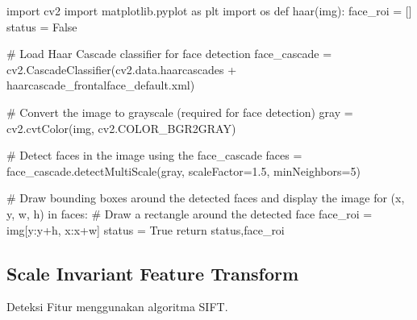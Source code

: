 \documentclass[
  letterpaper,
  DIV=11,
  numbers=noendperiod]{scrreprt}
\newenvironment{Shaded}{\begin{snugshade}}{\end{snugshade}}
\newcommand{\CommentTok}[1]{\textcolor[rgb]{0.37,0.37,0.37}{#1}}
\newcommand{\ControlFlowTok}[1]{\textcolor[rgb]{0.00,0.23,0.31}{#1}}
\newcommand{\DecValTok}[1]{\textcolor[rgb]{0.68,0.00,0.00}{#1}}
\newcommand{\FloatTok}[1]{\textcolor[rgb]{0.68,0.00,0.00}{#1}}
\newcommand{\ImportTok}[1]{\textcolor[rgb]{0.00,0.46,0.62}{#1}}
\newcommand{\KeywordTok}[1]{\textcolor[rgb]{0.00,0.23,0.31}{#1}}
\newcommand{\NormalTok}[1]{\textcolor[rgb]{0.00,0.23,0.31}{#1}}
\newcommand{\OperatorTok}[1]{\textcolor[rgb]{0.37,0.37,0.37}{#1}}
\newcommand{\StringTok}[1]{\textcolor[rgb]{0.13,0.47,0.30}{#1}}
\newcommand{\VariableTok}[1]{\textcolor[rgb]{0.07,0.07,0.07}{#1}}
\begin{document}
\begin{Shaded}
\begin{Highlighting}[]
\ImportTok{import}\NormalTok{ cv2}
\ImportTok{import}\NormalTok{ matplotlib.pyplot }\ImportTok{as}\NormalTok{ plt}
\ImportTok{import}\NormalTok{ os}
\KeywordTok{def}\NormalTok{ haar(img):}
\NormalTok{    face\_roi }\OperatorTok{=}\NormalTok{ []}
\NormalTok{    status }\OperatorTok{=} \VariableTok{False}  

    \CommentTok{\# Load Haar Cascade classifier for face detection}
\NormalTok{    face\_cascade }\OperatorTok{=}\NormalTok{ cv2.CascadeClassifier(cv2.data.haarcascades }\OperatorTok{+} \StringTok{\textquotesingle{}haarcascade\_frontalface\_default.xml\textquotesingle{}}\NormalTok{)  }

    \CommentTok{\# Convert the image to grayscale (required for face detection)}
\NormalTok{    gray }\OperatorTok{=}\NormalTok{ cv2.cvtColor(img, cv2.COLOR\_BGR2GRAY)}

    \CommentTok{\# Detect faces in the image using the face\_cascade}
\NormalTok{    faces }\OperatorTok{=}\NormalTok{ face\_cascade.detectMultiScale(gray, scaleFactor}\OperatorTok{=}\FloatTok{1.5}\NormalTok{, minNeighbors}\OperatorTok{=}\DecValTok{5}\NormalTok{)  }

    \CommentTok{\# Draw bounding boxes around the detected faces and display the image}
    \ControlFlowTok{for}\NormalTok{ (x, y, w, h) }\KeywordTok{in}\NormalTok{ faces:}
        \CommentTok{\# Draw a rectangle around the detected face}
\NormalTok{        face\_roi }\OperatorTok{=}\NormalTok{ img[y:y}\OperatorTok{+}\NormalTok{h, x:x}\OperatorTok{+}\NormalTok{w]}
\NormalTok{        status }\OperatorTok{=} \VariableTok{True}
    \ControlFlowTok{return}\NormalTok{ status,face\_roi}
\end{Highlighting}
\end{Shaded}

\hypertarget{scale-invariant-feature-transform-1}{%
\subsection*{Scale Invariant Feature
Transform}\label{scale-invariant-feature-transform-1}}

Deteksi Fitur menggunakan algoritma SIFT.
\end{document}
